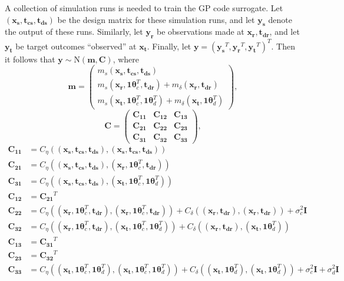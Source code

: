 \documentclass[12pt]{article}
\begin{document}
%
A collection of simulation runs is needed to train the GP code surrogate.
%
Let $(\mathbf{x_s},\mathbf{t_{cs}},\mathbf{t_{ds}})$ be the design matrix for these simulation runs, and let $\mathbf{y_s}$ denote the output of these runs.
%
Similarly, let $\mathbf{y_r}$ be observations made at $\mathbf{x_r},\mathbf{t_{dr}}$, and let $\mathbf {y_t}$ be target outcomes ``observed'' at $\mathbf {x_t}$.
%
Finally, let $\mathbf y = (\mathbf{y_s}^T,\mathbf{y_r}^T,\mathbf{y_t}^T)^T$.
%
Then it follows that $\mathbf y\sim \mathrm{N}(\mathbf m,\mathbf C)$, where
\[
\mathbf m = \begin{pmatrix}
m_s(\mathbf{x_s},\mathbf{t_{cs}},\mathbf{t_{ds}})\\
m_s(\mathbf{x_r},\mathbf1\boldsymbol\theta_c^T,\mathbf{t_{dr}}) + m_\delta(\mathbf{x_r},\mathbf{t_{dr}})\\
m_s(\mathbf{x_t},\mathbf1\boldsymbol\theta_c^T,\mathbf1\boldsymbol\theta_d^T) + m_\delta(\mathbf{x_t},\mathbf1\boldsymbol\theta_d^T)
\end{pmatrix},
\]
\[
\mathbf C = \begin{pmatrix}
\mathbf{C_{11}} & \mathbf{C_{12}} & \mathbf{C_{13}}\\
\mathbf{C_{21}} & \mathbf{C_{22}} & \mathbf{C_{23}}\\
\mathbf{C_{31}} & \mathbf{C_{32}} & \mathbf{C_{33}}
\end{pmatrix},
\]
\begin{align*}
\mathbf{C_{11}}&=C_\eta\left((\mathbf{x_s},\mathbf{t_{cs}},\mathbf{t_{ds}}),(\mathbf{x_s},\mathbf{t_{cs}},\mathbf{t_{ds}})\right)\\
\mathbf{C_{21}}&=C_\eta\left((\mathbf{x_s},\mathbf{t_{cs}},\mathbf{t_{ds}}),(\mathbf{x_r},\mathbf1\boldsymbol\theta_c^T,\mathbf{t_{dr}})\right)\\
\mathbf{C_{31}}&=C_\eta\left((\mathbf{x_s},\mathbf{t_{cs}},\mathbf{t_{ds}}),(\mathbf{x_t},\mathbf1\boldsymbol\theta_c^T,\mathbf1\boldsymbol\theta_d^T)\right)\\
\mathbf{C_{12}}&=\mathbf{C_{21}}^T\\
\mathbf{C_{22}}&=C_\eta\left((\mathbf{x_r},\mathbf1\boldsymbol\theta_c^T,\mathbf{t_{dr}}),(\mathbf{x_r},\mathbf1\boldsymbol\theta_c^T,\mathbf{t_{dr}})\right) + C_\delta\left( (\mathbf{x_r},\mathbf{t_{dr}}),(\mathbf{x_r},\mathbf{t_{dr}}) \right) + \sigma^2_c \mathbf I\\
\mathbf{C_{32}}&=C_\eta\left((\mathbf{x_r},\mathbf1\boldsymbol\theta_c^T,\mathbf{t_{dr}}),(\mathbf{x_t},\mathbf1\boldsymbol\theta_c^T,\mathbf1\boldsymbol\theta_d^T)\right) + C_\delta\left( (\mathbf{x_r},\mathbf{t_{dr}}),(\mathbf{x_t},\mathbf1\boldsymbol\theta_d^T) \right)\\
\mathbf{C_{13}}&=\mathbf{C_{31}}^T\\
\mathbf{C_{23}}&=\mathbf{C_{32}}^T\\
\mathbf{C_{33}}&=C_\eta\left((\mathbf{x_t},\mathbf1\boldsymbol\theta_c^T,\mathbf1\boldsymbol\theta_d^T),(\mathbf{x_t},\mathbf1\boldsymbol\theta_c^T,\mathbf1\boldsymbol\theta_d^T)\right) + C_\delta\left( (\mathbf{x_t},\mathbf1\boldsymbol\theta_d^T),(\mathbf{x_t},\mathbf1\boldsymbol\theta_d^T) \right) + \sigma^2_c\mathbf I + \sigma^2_d \mathbf I
\end{align*}
\end{document}
